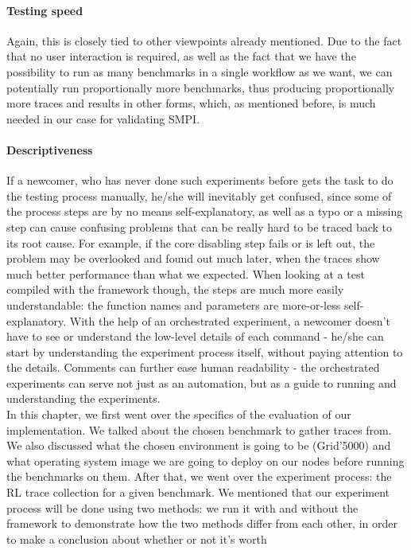 \paragraph{Testing speed}
Again, this is closely tied to other viewpoints already mentioned. Due
to the fact that no user interaction is required, as well as the fact
that we have the possibility to run as many benchmarks in a single
workflow as we want, we can potentially run proportionally more
benchmarks, thus producing proportionally more traces and results in
other forms, which, as mentioned before, is much needed in our case
for validating SMPI.
\paragraph{Descriptiveness}
If a newcomer, who has never done such experiments before gets the
task to do the testing process manually, he/she will inevitably get
confused, since some of the process steps are by no means
self-explanatory, as well as a typo or a missing step can cause
confusing problems that can be really hard to be traced back to its
root cause. For example, if the core disabling step fails or is left
out, the problem may be overlooked and found out much later, when the
traces show much better performance than what we expected. When
looking at a test compiled with the framework though, the steps are
much more easily understandable: the function names and parameters are
more-or-less self-explanatory. With the help of an orchestrated
experiment, a newcomer doesn't have to see or understand the low-level
details of each command - he/she can start by understanding the
experiment process itself, without paying attention to the
details. Comments can further ease human readability - the
orchestrated experiments can serve not just as an
automation, but as a guide to running and understanding the
experiments.\\[0.5cm]
In this chapter, we first went over the specifics of the evaluation of
our implementation. We talked about the chosen benchmark to
gather traces from. We also discussed what the chosen
environment is going to be (Grid'5000) and what operating system image
we are going to deploy on our nodes before running the benchmarks on
them. After that, we went over the experiment process: the RL trace
collection for a given benchmark. We mentioned that our experiment
process will be done using two methods: we run it with and without the
framework to demonstrate how the two methods differ from each
other, in order to make a conclusion about whether or not it's worth
